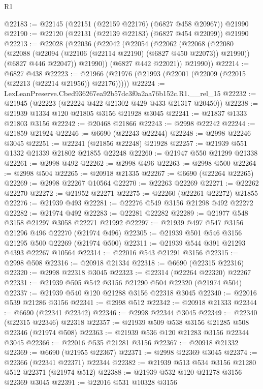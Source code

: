 \begin{lexlean}{R1}
\begin{coremodule}
@22183 := @22145 (@22151 (@22159 @22176) (@6827 @458 @20967)) @21990
@22190 := @22120 (@22131 (@22139 @22183) (@6827 @454 @22099)) @21990
@22213 := @22028
    (@22036
      (@22042
        (@22054
          (@22062
            (@22068
              (@22080
                (@22088 (@22094 (@22106 (@22114 @22190) (@6827 @450 @22073)) @21990))
                (@6827 @446 @22047))
              @21990))
          (@6827 @442 @22021))
        @21990))
@22214 := @6827 @438
@22223 := @21966 (@21976 (@21993 (@22001 (@22009 (@22015 (@22213 (@22214 @21956)) @22176)))))
@22224 := LexLeanPreserve.Cbed936267ea92b57dc3f0a2aa76b152c.R1.__rel_15
@22232 := @21945 (@22223 (@22224 @422 @21302 @429 @433 @21317 @20450))
@22238 := @21939 @1334 @120 @21805 @3156 @21928 @3045
@22241 := @21837 @1333 @21803 @3156
@22242 := @20468 @21866
@22243 := @2998 @22242
@22244 := @21859 @21924
@22246 := @6690 (@22243 @22244)
@22248 := @2998 @22246 @3045
@22251 := @22241 (@21856 @22248) @21928
@22257 := @21939 @551 @1332 @21339 @21802 @21855 @22248
@22260 := @21947 @550 @21299 @21338
@22261 := @2998 @492
@22262 := @2998 @496
@22263 := @2998 @500
@22264 := @2998 @504
@22265 := @20918 @21335
@22267 := @6690 (@22264 @22265)
@22269 := @2998 @22267 @10564
@22270 := @22263 @22269
@22271 := @22262 @22270
@22272 := @21952 @22271
@22275 := @22260 (@22261 @22272) @21855
@22276 := @21939 @493
@22281 := @22276 @549 @3156 @21298 @492 @22272
@22282 := @21974 @492
@22283 := @22281 @22282
@22289 := @21977 @548 @3158 @21297 @3058 @22271 @21992
@22297 := @21939 @497 @547 @3156 @21296 @496 @22270 (@21974 @496)
@22305 := @21939 @501 @546 @3156 @21295 @500 @22269 (@21974 @500)
@22311 := @21939 @544 @391 @21293 @4393 @22267 @10564
@22314 := @22016 @543 @21291 @3156
@22315 := @2998 @508
@22316 := @20918 @21334
@22318 := @6690 (@22315 @22316)
@22320 := @2998 @22318 @3045
@22323 := @22314 (@22264 @22320) @22267
@22331 := @21939 @505 @542 @3156 @21290 @504 @22320 (@21974 @504)
@22337 := @21939 @540 @120 @21288 @3156 @22318 @3045
@22340 := @22016 @539 @21286 @3156
@22341 := @2998 @512
@22342 := @20918 @21333
@22344 := @6690 (@22341 @22342)
@22346 := @2998 @22344 @3045
@22349 := @22340 (@22315 @22346) @22318
@22357 := @21939 @509 @538 @3156 @21285 @508 @22346 (@21974 @508)
@22363 := @21939 @536 @120 @21283 @3156 @22344 @3045
@22366 := @22016 @535 @21281 @3156
@22367 := @20918 @21332
@22369 := @6690 (@21955 @22367)
@22371 := @2998 @22369 @3045
@22374 := @22366 (@22341 @22371) @22344
@22382 := @21939 @513 @534 @3156 @21280 @512 @22371 (@21974 @512)
@22388 := @21939 @532 @120 @21278 @3156 @22369 @3045
@22391 := @22016 @531 @10328 @3156

\end{coremodule}
\end{lexlean}
